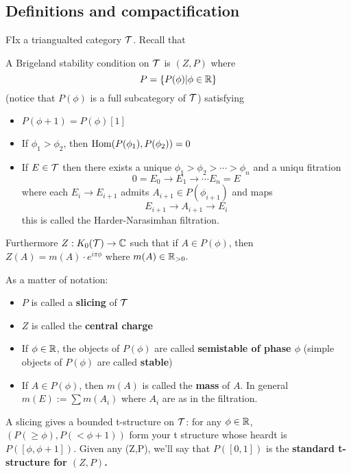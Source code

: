 \documentclass[12pt]{article}
\begin{document}
\subsection{Definitions and compactification}
FIx a triangualted category $\mathcal{T}$. Recall that 
\begin{defn}
	A Brigeland stability condition on $\mathcal{T}$ is $(Z,P)$ where 
	\[P=\{P(\phi)|\phi\in\mathbb{R}\}\]
	(notice that $P(\phi)$ is a full subcategory of $\mathcal{T}$) satisfying 
	\begin{itemize}
		\item $P(\phi+1)=P(\phi)[1]$
		\item If $\phi_1>\phi_2$, then $\operatorname{Hom}(P(\phi_1),P(\phi_2))=0$
		\item If $E\in\mathcal{T}$ then there exists a unique $\phi_1>\phi_2>\cdots>\phi_n$ and a uniqu fitration 
		\[0=E_0\to E_1\to\cdots E_n=E\]
		where each $E_i\to E_{i+1}$ admits $A_{i+1}\in P(\phi_{i+1})$ and maps 
		\[E_{i+1}\to A_{i+1}\to E_i\]
		this is called the Harder-Narasimhan filtration.
	\end{itemize}

	Furthermore $Z:K_0(\mathcal{T})\to\mathbb{C}$ such that if $A\in P(\phi)$, then $Z(A)=m(A)\cdot e^{i\pi\phi}$ where $m(A)\in\mathbb{R}_{>0}.$
\end{defn}

As a matter of notation:
\begin{itemize}
	\item $P$ is called a \textbf{slicing} of $\mathcal{T}$
	\item $Z$ is called the \textbf{central charge}
	\item If $\phi\in\mathbb{R}$, the objects of $P(\phi)$ are called \textbf{semistable of phase $\phi$} (simple objects of $P(\phi)$ are called \textbf{stable})
	\item If $A\in P(\phi)$, then $m(A)$ is called the \textbf{mass} of $A$. In general $m(E):=\sum m(A_i)$ where $A_i$ are as in the filtration.
\end{itemize} 

A slicing gives a bounded t-structure on $\mathcal{T}$: for any $\phi\in\mathbb{R}$, $(P(\ge\phi),P(<\phi+1))$
form your t structure whose heardt is $P([\phi,\phi+1])$. Given any (Z,P), we'll say that $P([0,1])$ is the \textbf{standard t-structure for $(Z,P)$.}
\end{document}
